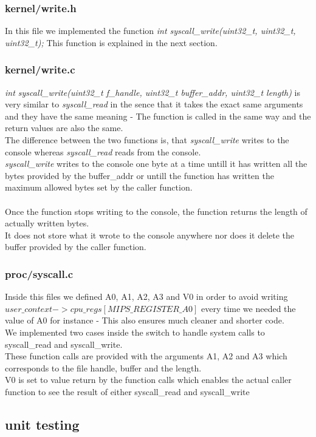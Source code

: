 \documentclass[a4paper,12pt,danish]{report}
\begin{document}
\subsubsection{kernel/write.h}
In this file we implemented the function \textit{int syscall\_write(uint32\_t, uint32\_t, uint32\_t);}
This function is explained in the next section.
\subsubsection{kernel/write.c}
\textit{int syscall\_write(uint32\_t f\_handle, uint32\_t buffer\_addr, uint32\_t length)} is very similar to \textit{syscall\_read} in the sence that it takes the exact same arguments and they have the same meaning - The function is called in the same way and the return values are also the same.
\\
The difference between the two functions is, that \textit{syscall\_write} writes to the console whereas \textit{syscall\_read} reads from the console.
\\
\textit{syscall\_write} writes to the console one byte at a time untill it has written all the bytes provided by the buffer\_addr or untill the function has written the maximum allowed bytes set by the caller function.
\\
\\
Once the function stops writing to the console, the function returns the length of actually written bytes.
\\
It does not store what it wrote to the console anywhere nor does it delete the buffer provided by the caller function.
\subsubsection{proc/syscall.c}
Inside this files we defined A0, A1, A2, A3 and V0 in order to avoid writing \textit{$user\_context->cpu\_regs[MIPS\_REGISTER\_A0]$} every time we needed the value of A0 for instance - This also ensures much cleaner and shorter code.
\\
We implemented two cases inside the switch to handle system calls to syscall\_read and syscall\_write.
\\
These function calls are provided with the arguments A1, A2 and A3 which corresponds to the file handle, buffer and the length.\\
V0 is set to value return by the function calls which enables the actual caller function to see the result of either syscall\_read and syscall\_write
\subsection{unit testing}
\end{document}
